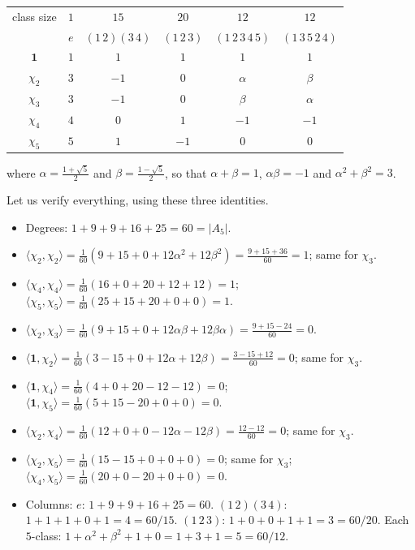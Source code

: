 \documentclass[a4paper]{scrartcl}
\newcommand{\ip}[2]{\langle #1, #2 \rangle}
\begin{document}
\begin{center}
\renewcommand{\arraystretch}{1.35}
\setlength{\tabcolsep}{9pt}
\begin{tabular}{c|ccccc}
\toprule
class size & $1$ & $15$ & $20$ & $12$ & $12$\\
 & $e$ & $(1\,2)(3\,4)$ & $(1\,2\,3)$ & $(1\,2\,3\,4\,5)$ & $(1\,3\,5\,2\,4)$\\
\midrule
$\mathbf 1$ & $1$ & $1$ & $1$ & $1$ & $1$\\
$\chi_2$ & $3$ & $-1$ & $0$ & $\alpha$ & $\beta$\\
$\chi_3$ & $3$ & $-1$ & $0$ & $\beta$ & $\alpha$\\
$\chi_4$ & $4$ & $0$ & $1$ & $-1$ & $-1$\\
$\chi_5$ & $5$ & $1$ & $-1$ & $0$ & $0$\\
\bottomrule
\end{tabular}
\end{center}
where $\alpha = \frac{1+\sqrt5}2$ and $\beta = \frac{1-\sqrt5}2$, so that $\alpha+\beta = 1$, $\alpha\beta = -1$ and $\alpha^2+\beta^2 = 3$.

Let us verify everything, using these three identities.
\begin{itemize}
	\item Degrees: $1 + 9 + 9 + 16 + 25 = 60 = |A_5|$.
	\item $\ip{\chi_2}{\chi_2} = \frac1{60}(9 + 15 + 0 + 12\alpha^2 + 12\beta^2) = \frac{9+15+36}{60} = 1$; same for $\chi_3$.
	\item $\ip{\chi_4}{\chi_4} = \frac1{60}(16 + 0 + 20 + 12 + 12) = 1$; \; $\ip{\chi_5}{\chi_5} = \frac1{60}(25 + 15 + 20 + 0 + 0) = 1$.
	\item $\ip{\chi_2}{\chi_3} = \frac1{60}(9 + 15 + 0 + 12\alpha\beta + 12\beta\alpha) = \frac{9+15-24}{60} = 0$.
	\item $\ip{\mathbf1}{\chi_2} = \frac1{60}(3 - 15 + 0 + 12\alpha + 12\beta) = \frac{3-15+12}{60}=0$; same for $\chi_3$.
	\item $\ip{\mathbf1}{\chi_4} = \frac1{60}(4+0+20-12-12) = 0$; \; $\ip{\mathbf1}{\chi_5} = \frac1{60}(5+15-20+0+0)=0$.
	\item $\ip{\chi_2}{\chi_4} = \frac1{60}(12 + 0 + 0 - 12\alpha - 12\beta) = \frac{12-12}{60} = 0$; same for $\chi_3$.
	\item $\ip{\chi_2}{\chi_5} = \frac1{60}(15 - 15 + 0 + 0 + 0)=0$; same for $\chi_3$; \; $\ip{\chi_4}{\chi_5} = \frac1{60}(20 + 0 - 20 + 0 + 0) = 0$.
	\item Columns: $e$: $1+9+9+16+25 = 60$. \;$(1\,2)(3\,4)$: $1+1+1+0+1 = 4 = 60/15$. \;$(1\,2\,3)$: $1+0+0+1+1 = 3 = 60/20$. \;Each $5$-class: $1 + \alpha^2+\beta^2+1+0 = 1+3+1 = 5 = 60/12$.
\end{itemize}
\end{document}

